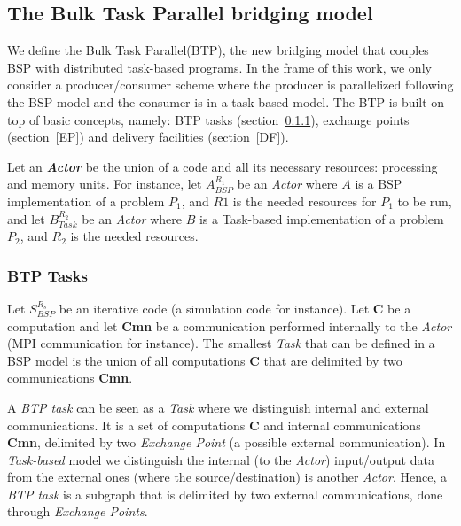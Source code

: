 \subsection{The Bulk Task Parallel bridging model}

We define the Bulk Task Parallel(BTP), the new bridging model that couples BSP with distributed task-based programs. In the frame of this work, we only consider a producer/consumer scheme where the producer is parallelized following the BSP model and the consumer is in a task-based model.  The BTP is built on top of basic concepts, namely: BTP tasks (section~\ref{btptask}), exchange points (section~\ref{EP}) and delivery facilities (section~\ref{DF}).  

Let an \textbf{\textit{Actor}} be the union of a code and all its necessary resources: processing and memory units.   
For instance, let $A_{BSP}^{R_{1}}$ be an \textit{Actor} where $A$ is a BSP implementation of a problem $P_{1}$, and $R1$ is the needed resources for $P_{1}$ to be run, and let $B_{Task}^{R_{2}}$ be an \textit{Actor} where $B$ is a Task-based implementation of a problem $P_{2}$, and $R_{2}$ is the needed resources.

\subsubsection{BTP Tasks}\label{btptask}
Let $S_{BSP}^{R_{s}}$ be an iterative code (a simulation code for instance). Let \textbf{C} be a computation and let \textbf{Cmn} be a communication performed internally to the \textit{Actor} (MPI communication for instance). The smallest \textit{Task} that can be defined in a BSP model is the union of all computations \textbf{C} that are delimited by two communications \textbf{Cmn}. 

A \textit{BTP task} can be seen as a \textit{Task} where we distinguish internal and external communications. It is a set of computations \textbf{C} and internal communications \textbf{Cmn}, delimited by two \textit{Exchange Point} (a possible external communication). In \textit{Task-based} model we distinguish the internal (to the \textit{Actor}) input/output data from the external ones (where the source/destination) is another \textit{Actor}. Hence, a \textit{BTP task} is a subgraph that is delimited by two external communications, done through \textit{Exchange Points}.


